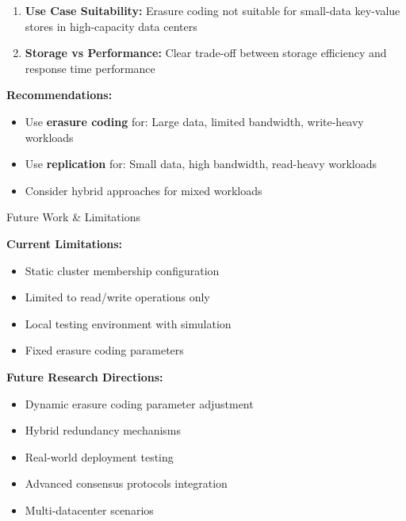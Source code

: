 \documentclass[a0,landscape]{config/poster/a0poster}
\newcommand{\postersection}[1]{%
  \begin{tcolorbox}[
      colback=ITBblue,
      colframe=ITBblue,
      fonttitle=\bfseries,
      coltext=white,
      sharp corners,
      boxrule=0pt,
      top=6pt,
      bottom=6pt,
      halign=center
    ]
    \Large #1
  \end{tcolorbox}%
}
\begin{document}
\begin{multicols}{4}
\begin{enumerate}
		\item \textbf{Use Case Suitability:} Erasure coding not suitable for small-data key-value stores in high-capacity data centers
		
		\item \textbf{Storage vs Performance:} Clear trade-off between storage efficiency and response time performance
	\end{enumerate}

	\textbf{Recommendations:}
	\begin{itemize}
		\item Use \textcolor{ECcolor}{\textbf{erasure coding}} for: Large data, limited bandwidth, write-heavy workloads
		\item Use \textcolor{REPcolor}{\textbf{replication}} for: Small data, high bandwidth, read-heavy workloads
		\item Consider hybrid approaches for mixed workloads
	\end{itemize}


	\postersection{Future Work \& Limitations}
	
	\textbf{Current Limitations:}
	\begin{itemize}
		\item Static cluster membership configuration
		\item Limited to read/write operations only
		\item Local testing environment with simulation
		\item Fixed erasure coding parameters
	\end{itemize}

	\textbf{Future Research Directions:}
	\begin{itemize}
		\item Dynamic erasure coding parameter adjustment
		\item Hybrid redundancy mechanisms
		\item Real-world deployment testing
		\item Advanced consensus protocols integration
		\item Multi-datacenter scenarios
	\end{itemize}



\end{multicols}
\end{document}

